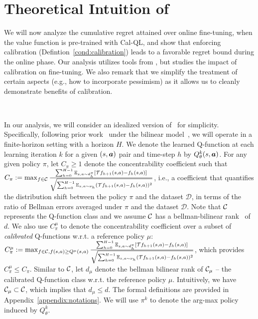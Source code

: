 \vspace{-0.15cm}
\section{Theoretical Intuition of \methodname}
\label{sec:theory}
\vspace{-0.25cm}

We will now analyze the cumulative regret attained over online fine-tuning, when the value function is pre-trained with Cal-QL, and show that enforcing calibration (Defintion~\ref{cond:calibration}) leads to a favorable regret bound during the online phase. Our analysis utilizes tools from \citet{song2023hybrid}, but studies the impact of calibration on fine-tuning. We also remark that we simplify the treatment of certain aspects (e.g., how to incorporate pessimism) as it allows us to cleanly demonstrate benefits of calibration.  

~

 In our analysis, we will consider an idealized version of \methodname\ for simplicity. Specifically, following prior work~\citep{song2023hybrid} under the bilinear model~\citep{du2021bilinear}, we will operate in a finite-horizon setting with a horizon $H$. We denote the learned Q-function at each learning iteration $k$ for a given $(s, \boldsymbol{a})$ pair and time-step $h$ by $Q_{\theta}^k(s, \boldsymbol{a})$. For any given policy $\pi$, let $C_\pi\geq1$ denote the concentrability coefficient such that $C_\pi:=\max_{f\in \mathcal C}\frac{\sum_{h=0}^{H-1}\mathbb E_{s,a\sim d_h^\pi}[\mathcal T f_{h+1}(s,a)-f_h(s,a)]}{\sqrt{\sum_{h=0}^{H-1}\mathbb E_{s,a\sim \nu_h}(\mathcal T f_{h+1}(s,a)-f_h(s,a))^2}}$,
i.e., a coefficient that quantifies the distribution shift between the policy $\pi$ and the dataset $\mathcal{D}$, in terms of the ratio of Bellman errors averaged under $\pi$ and the dataset $\mathcal{D}$. Note that $\mathcal C$ represents the Q-function class and we assume $\mathcal C$ has a bellman-bilinear rank~\citep{du2021bilinear} of $d$. We also use $C_\pi^\mu$ to denote the concentrability coefficient over a subset of {\em calibrated} Q-functions w.r.t. a reference policy $\mu$: $C^\mu_\pi:=\max_{f\in \mathcal C,f(s,a)\geq Q^\mu(s,a)}\frac{\sum_{h=0}^{H-1}\mathbb E_{s,a\sim d_h^\pi}[\mathcal T f_{h+1}(s,a)-f_h(s,a)]}{\sqrt{\sum_{h=0}^{H-1}\mathbb E_{s,a\sim \nu_h}(\mathcal T f_{h+1}(s,a)-f_h(s,a))^2}}$, which provides $C^\mu_\pi\leq C_\pi$. Similar to $\mathcal C$, let $d_\mu$ denote the bellman bilinear rank of $\mathcal C_\mu$ -- 
the calibrated Q-function class w.r.t. the reference policy $\mu$.
Intuitively, we have $\mathcal C_\mu\subset\mathcal C$, which implies that $d_\mu\leq d$. The formal definitions are provided in Appendix~\ref{appendix:notations}.
We will use $\pi^k$ to denote the arg-max policy induced by $Q^k_\theta$. 


